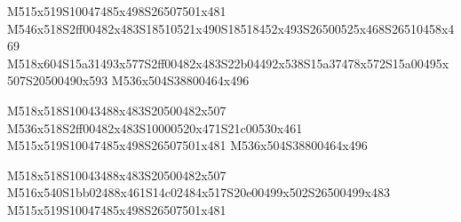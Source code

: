 \documentclass{article}
\begin{document}
\begin{multicols}{5}
\begin{center}
M515x519S10047485x498S26507501x481 %
M546x518S2ff00482x483S18510521x490S18518452x493S26500525x468S26510458x469 %
M518x604S15a31493x577S2ff00482x483S22b04492x538S15a37478x572S15a00495x507S20500490x593 %
M536x504S38800464x496 %

M518x518S10043488x483S20500482x507 %
M536x518S2ff00482x483S10000520x471S21c00530x461 %
M515x519S10047485x498S26507501x481 %
M536x504S38800464x496 %

M518x518S10043488x483S20500482x507 %
M516x540S1bb02488x461S14c02484x517S20e00499x502S26500499x483 %
M515x519S10047485x498S26507501x481 %
\end{center}
\end{multicols}
\end{document}
